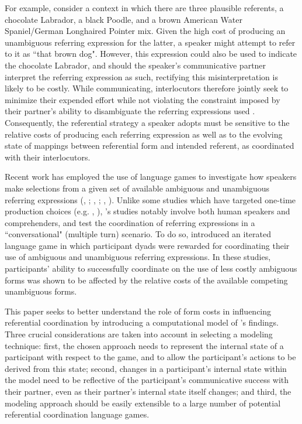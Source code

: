 \documentclass[11pt]{article}
\begin{document}
For example, consider a context in which there are three plausible referents, a chocolate Labrador, a black Poodle, and a brown American Water Spaniel/German Longhaired Pointer mix. Given the high cost of producing an unambiguous referring expression for the latter, a speaker might attempt to refer to it as ``that brown dog". However, this expression could also be used to indicate the chocolate Labrador, and should the speaker's communicative partner interpret the referring expression as such, rectifying this misinterpretation is likely to be costly. While communicating, interlocutors therefore jointly seek to minimize their expended effort while not violating the constraint imposed by their partner's ability to disambiguate the referring expressions used \citep{benz2005}. Consequently, the referential strategy a speaker adopts must be sensitive to the relative costs of producing each referring expression as well as to the evolving state of mappings between referential form and intended referent, as coordinated with their interlocutors. 

Recent work has employed the use of language games to investigate how speakers make selections from a given set of available ambiguous and unambiguous referring expressions (\citeauthor{rohde2012}, \citeyear{rohde2012}; \citeauthor{degen2012}, \citeyear{degen2012}; \citeauthor{frank2012}, \citeyear{frank2012}). Unlike some studies which have targeted one-time production choices (e.g. \citeauthor{degen2012}, \citeyear{degen2012}), \citeauthor{rohde2012}'s studies notably involve both human speakers and comprehenders, and test the coordination of referring expressions in a ``conversational" (multiple turn) scenario. To do so, \cite{rohde2012} introduced an iterated language game in which participant dyads were rewarded for coordinating their use of ambiguous and unambiguous referring expressions. In these studies, participants' ability to successfully coordinate on the use of less costly ambiguous forms was shown to be affected by the relative costs of the available competing unambiguous forms. 

This paper seeks to better understand the role of form costs in influencing referential coordination by introducing a computational model of \citeauthor{rohde2012}'s findings. Three crucial considerations are taken into account in selecting a modeling technique: first, the chosen approach needs to represent the internal state of a participant with respect to the game, and to allow the participant's actions to be derived from this state; second, changes in a participant's internal state within the model need to be reflective of the participant's communicative success with their partner, even as their partner's internal state itself changes; and third, the modeling approach should be easily extensible to a large number of potential referential coordination language games. 
\end{document}
